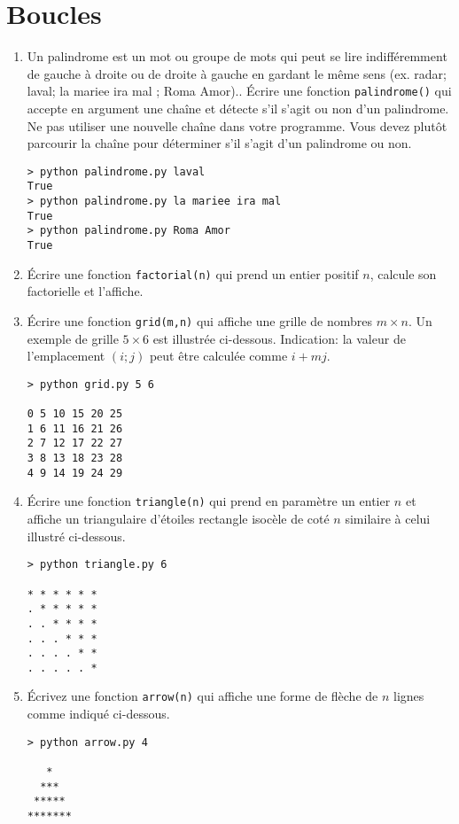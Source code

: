 \documentclass[a4paper]{article}
\begin{document}
\section{Boucles}
\begin{enumerate}
\item Un palindrome est un mot ou groupe de mots qui peut se lire indifféremment de gauche à droite ou de droite à gauche en gardant le même sens (ex. radar; laval; la mariee ira mal ; Roma Amor)..  Écrire une fonction {\tt palindrome()} qui accepte en argument une chaîne et détecte s'il s'agit ou non d'un palindrome. Ne pas utiliser une nouvelle chaîne dans votre programme. Vous devez plutôt parcourir la chaîne pour déterminer s'il s'agit d'un palindrome ou non.
\begin{verbatim}
> python palindrome.py laval
True
> python palindrome.py la mariee ira mal
True
> python palindrome.py Roma Amor
True
\end{verbatim}


\item Écrire une fonction {\tt factorial(n)} qui prend un entier positif $n$, calcule son
factorielle et l'affiche.
\item Écrire une fonction {\tt grid(m,n)} qui affiche une  grille de nombres $m\times  n$. Un exemple de grille $5\times  6$ est illustrée ci-dessous. Indication: la valeur de l'emplacement $(i; j)$ peut être calculée comme $i + mj$.

\begin{verbatim}
> python grid.py 5 6

0 5 10 15 20 25
1 6 11 16 21 26
2 7 12 17 22 27
3 8 13 18 23 28
4 9 14 19 24 29
\end{verbatim}

\item Écrire une fonction {\tt triangle(n)} qui prend en paramètre un entier $n$ et affiche un  triangulaire d'étoiles rectangle isocèle de coté $n$ similaire à celui illustré ci-dessous.

\begin{verbatim}
> python triangle.py 6

* * * * * *
. * * * * *
. . * * * *
. . . * * *
. . . . * *
. . . . . *
\end{verbatim}
\item Écrivez une fonction {\tt arrow(n)} qui affiche une forme de flèche de $n$ lignes comme indiqué ci-dessous.
\begin{verbatim}
> python arrow.py 4

   *
  ***
 *****
*******
\end{verbatim}


\end{enumerate}
\end{document}
